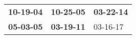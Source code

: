 \begin{supertabular}{p{0.33\columnwidth}p{0.33\columnwidth}p{0.33\columnwidth}}
 \textbf{10-19-04\textsuperscript{}} &  \textbf{10-25-05\textsuperscript{}} &  \textbf{03-22-14\textsuperscript{}} \\
 \textbf{05-03-05\textsuperscript{}} &  \textbf{03-19-11\textsuperscript{}} &           03-16-17\textsuperscript{} \\
\end{supertabular}
